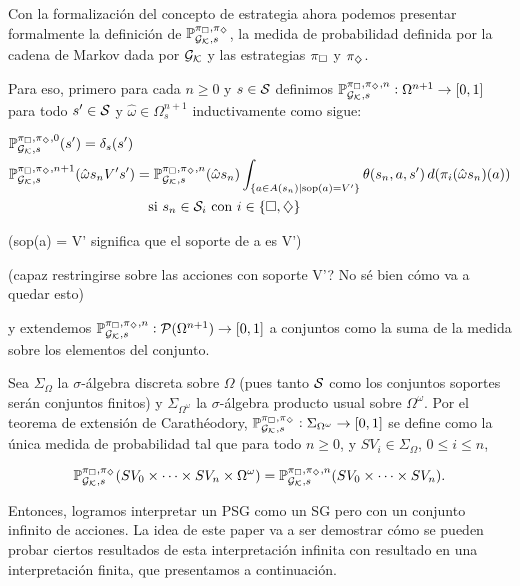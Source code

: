 \begin{boxamarillo}{}
	Con la formalización del concepto de estrategia ahora podemos presentar
	formalmente la definición de $\mathbb{P}_{\mathcal{G}_{\mathcal{K}}, s}^{\pi_\square, \pi_\diamondsuit}$, la medida de probabilidad definida por
	la cadena de Markov dada por $\mathcal{G}_{\mathcal{K}}$ y las estrategias $\pi_\square$ y $\pi_\diamondsuit$.

	Para eso, primero para cada $n \geq 0$ y $s \in \mathcal{S}$ definimos $\mathbb{P}^{\pi_\square,
			\pi_\diamondsuit, n}_{\mathcal{G}_{\mathcal{K}}, s} : \Omega^{n+1} \rightarrow [0, 1]$ para todo $s' \in \mathcal{S}$
	y $\hat{\omega} \in \Omega_s^{n+1}$ inductivamente como sigue:

	\begin{align*}
		&\mathbb{P}^{\pi_\square, \pi_\diamondsuit, 0}_{\mathcal{G}_{\mathcal{K}}, s}(s') = \delta_s(s') \\
		&\mathbb{P}^{\pi_\square, \pi_\diamondsuit, n+1}_{\mathcal{G}_{\mathcal{K}}, s}(\hat{\omega}s_nV's') = \mathbb{P}^{\pi_\square, \pi_\diamondsuit, n}_{\mathcal{G}_{\mathcal{K}}, s}(\hat{\omega} s_n) \int_{\{ a \in A(s_n) \mid \text{sop}(a) = V'\}} \theta(s_n, a, s') \, d(\pi_i(\hat{\omega}s_n)(a)) \\ & \qquad \qquad \qquad \qquad \qquad \text{si } s_n \in \mathcal{S}_i \text{ con } i \in \{\square, \diamondsuit\}
	\end{align*}

	(sop(a) = V' significa que el soporte de a es V')

	(capaz restringirse sobre las acciones con soporte V'? No sé bien cómo va a quedar esto)

	y extendemos \( \mathbb{P}^{\pi_\square, \pi_\diamondsuit, n}_{\mathcal{G}_{\mathcal{K}}, s} :
	\mathcal{P}(\Omega^{n+1}) \to [0, 1] \) a conjuntos como la suma de la medida
	sobre los elementos del conjunto.

	Sea \( \Sigma_\Omega \) la \( \sigma \)-álgebra discreta sobre \( \Omega \)
	(pues tanto $\mathcal{S}$ como los conjuntos soportes serán conjuntos finitos) y \(
	\Sigma_{\Omega^\omega} \) la \( \sigma \)-álgebra producto usual sobre \(
	\Omega^\omega \). Por el teorema de extensión de Carathéodory, \(
	\mathbb{P}^{\pi_\square, \pi_\diamondsuit}_{\mathcal{G}_{\mathcal{K}}, s} : \Sigma_{\Omega^\omega} \to [0, 1] \) se
	define como la única medida de probabilidad tal que para todo \( n \geq 0 \), y
	\( SV_i \in \Sigma_\Omega \), \( 0 \leq i \leq n \),

	\[
		\mathbb{P}^{\pi_\square, \pi_\diamondsuit}_{\mathcal{G}_{\mathcal{K}}, s}(SV_0 \times \dots \times SV_n \times \Omega^\omega) = \mathbb{P}^{\pi_\square, \pi_\diamondsuit, n}_{\mathcal{G}_{\mathcal{K}}, s}(SV_0 \times \dots \times SV_n).
	\]
\end{boxamarillo}

Entonces, logramos interpretar un PSG como un SG pero con un conjunto infinito
de acciones. La idea de este paper va a ser demostrar cómo se pueden probar
ciertos resultados de esta interpretación infinita con resultado en una
interpretación finita, que presentamos a continuación.

